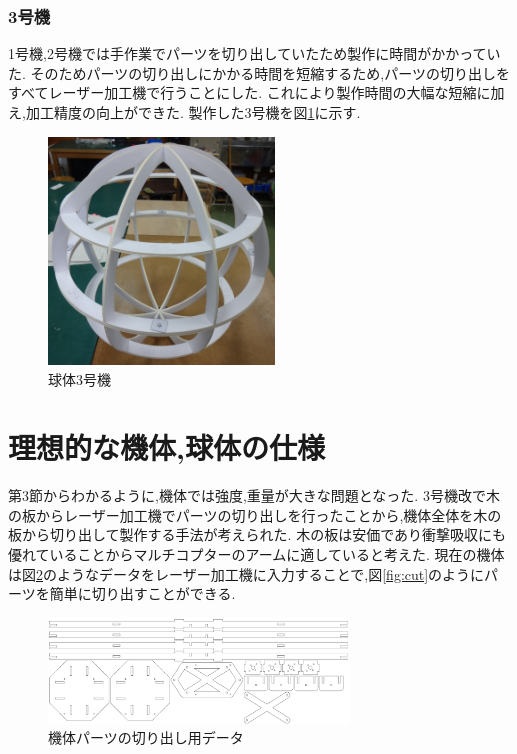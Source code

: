 \documentclass[12pt,oneside]{sotsuken_paper}
\begin{document}
\subsubsection{3号機}
1号機,2号機では手作業でパーツを切り出していたため製作に時間がかかっていた.
そのためパーツの切り出しにかかる時間を短縮するため,パーツの切り出しをすべてレーザー加工機で行うことにした.
これにより製作時間の大幅な短縮に加え,加工精度の向上ができた.
製作した3号機を図\ref{fig:sphere-3}に示す.

\begin{figure}[htbp]
	\begin{center}
		\includegraphics[width=60mm]{image/sphere/sphere-3.jpg}
		\caption{球体3号機}
		\label{fig:sphere-3}
	\end{center}
\end{figure}

\section{理想的な機体,球体の仕様}
第3節からわかるように,機体では強度,重量が大きな問題となった.
3号機改で木の板からレーザー加工機でパーツの切り出しを行ったことから,機体全体を木の板から切り出して製作する手法が考えられた.
木の板は安価であり衝撃吸収にも優れていることからマルチコプターのアームに適していると考えた.
現在の機体は図\ref{fig:CD-data}のようなデータをレーザー加工機に入力することで,図\ref{fig:cut}のようにパーツを簡単に切り出すことができる.

\begin{figure}[htbp]
	\begin{center}
		\includegraphics[width=80mm]{image/drone/CD-data.jpg}
		\caption{機体パーツの切り出し用データ}
		\label{fig:CD-data}
	\end{center}
\end{figure}
\end{document}

